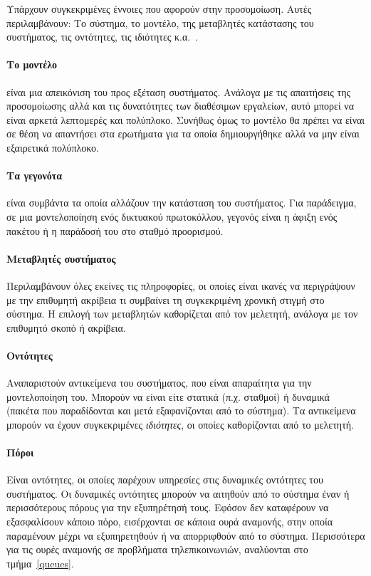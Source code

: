\documentclass[12pt]{report}
\begin{document}
Υπάρχουν συγκεκριμένες έννοιες που αφορούν στην προσομοίωση. Αυτές περιλαμβάνουν: Το σύστημα, το μοντέλο, της μεταβλητές κατάστασης του συστήματος, τις οντότητες, τις ιδιότητες κ.α.~\cite{book:04}.

\paragraph{Το μοντέλο} είναι μια απεικόνιση του προς εξέταση συστήματος. Ανάλογα με τις απαιτήσεις της προσομοίωσης αλλά και τις δυνατότητες των διαθέσιμων εργαλείων, αυτό μπορεί να είναι αρκετά λεπτομερές και πολύπλοκο. Συνήθως όμως το μοντέλο θα πρέπει να είναι σε θέση να απαντήσει στα ερωτήματα για τα οποία δημιουργήθηκε αλλά να μην είναι εξαιρετικά πολύπλοκο.

\paragraph{Τα γεγονότα} είναι συμβάντα τα οποία αλλάζουν την κατάσταση του συστήματος. Για παράδειγμα, σε μια μοντελοποίηση ενός δικτυακού πρωτοκόλλου, γεγονός είναι η άφιξη ενός πακέτου ή η παράδοσή του στο σταθμό προορισμού.

\paragraph{Μεταβλητές συστήματος} Περιλαμβάνουν όλες εκείνες τις πληροφορίες, οι οποίες είναι ικανές να περιγράψουν με την επιθυμητή ακρίβεια τι συμβαίνει τη συγκεκριμένη χρονική στιγμή στο σύστημα. Η επιλογή των μεταβλητών καθορίζεται από τον μελετητή, ανάλογα με τον επιθυμητό σκοπό ή ακρίβεια.

\paragraph{Οντότητες} Αναπαριστούν αντικείμενα του συστήματος, που είναι απαραίτητα για την μοντελοποίηση του. Μπορούν να είναι είτε στατικά (π.χ. σταθμοί) ή δυναμικά (πακέτα που παραδίδονται και μετά εξαφανίζονται από το σύστημα). Τα αντικείμενα μπορούν να έχουν συγκεκριμένες \textit{ιδιότητες}, οι οποίες καθορίζονται από το μελετητή.

\paragraph{Πόροι} Είναι οντότητες, οι οποίες παρέχουν υπηρεσίες στις δυναμικές οντότητες του συστήματος. Οι δυναμικές οντότητες μπορούν να αιτηθούν από το σύστημα έναν ή περισσότερους πόρους για την εξυπηρέτησή τους. Εφόσον δεν καταφέρουν να εξασφαλίσουν κάποιο πόρο, εισέρχονται σε κάποια ουρά αναμονής, στην οποία παραμένουν μέχρι να εξυπηρετηθούν ή να απορριφθούν από το σύστημα. Περισσότερα για τις ουρές αναμονής σε προβλήματα τηλεπικοινωνιών, αναλύονται στο τμήμα~\ref{queues}.
\end{document}
